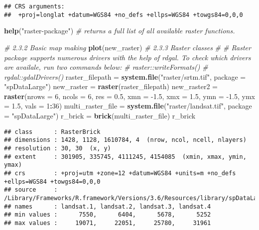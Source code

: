 \documentclass[]{article}
\newenvironment{Shaded}{\begin{snugshade}}{\end{snugshade}}
\newcommand{\CommentTok}[1]{\textcolor[rgb]{0.56,0.35,0.01}{\textit{#1}}}
\newcommand{\DataTypeTok}[1]{\textcolor[rgb]{0.13,0.29,0.53}{#1}}
\newcommand{\DecValTok}[1]{\textcolor[rgb]{0.00,0.00,0.81}{#1}}
\newcommand{\FloatTok}[1]{\textcolor[rgb]{0.00,0.00,0.81}{#1}}
\newcommand{\KeywordTok}[1]{\textcolor[rgb]{0.13,0.29,0.53}{\textbf{#1}}}
\newcommand{\NormalTok}[1]{#1}
\newcommand{\OperatorTok}[1]{\textcolor[rgb]{0.81,0.36,0.00}{\textbf{#1}}}
\newcommand{\StringTok}[1]{\textcolor[rgb]{0.31,0.60,0.02}{#1}}
\begin{document}
\begin{verbatim}
## CRS arguments:
##  +proj=longlat +datum=WGS84 +no_defs +ellps=WGS84 +towgs84=0,0,0
\end{verbatim}

\begin{Shaded}
\begin{Highlighting}[]
\KeywordTok{help}\NormalTok{(}\StringTok{"raster-package"}\NormalTok{) }\CommentTok{# returns a full list of all available raster functions.}

\CommentTok{# 2.3.2 Basic map making}
\KeywordTok{plot}\NormalTok{(new_raster)}
\CommentTok{# 2.3.3 Raster classes}
\CommentTok{# # Raster package supports numerous drivers with the help of rdgal. To check which drivers are availale, run two commands below:}
\CommentTok{# raster::writeFormats()}
\CommentTok{# rgdal::gdalDrivers()}
\NormalTok{raster_filepath =}\StringTok{ }\KeywordTok{system.file}\NormalTok{(}\StringTok{"raster/srtm.tif"}\NormalTok{, }\DataTypeTok{package =} \StringTok{"spDataLarge"}\NormalTok{)}
\NormalTok{new_raster =}\StringTok{ }\KeywordTok{raster}\NormalTok{(raster_filepath)}
\NormalTok{new_raster2 =}\StringTok{ }\KeywordTok{raster}\NormalTok{(}\DataTypeTok{nrows =} \DecValTok{6}\NormalTok{, }\DataTypeTok{ncols =} \DecValTok{6}\NormalTok{, }\DataTypeTok{res =} \FloatTok{0.5}\NormalTok{,}
                     \DataTypeTok{xmn =} \FloatTok{-1.5}\NormalTok{, }\DataTypeTok{xmx =} \FloatTok{1.5}\NormalTok{, }\DataTypeTok{ymn =} \FloatTok{-1.5}\NormalTok{, }\DataTypeTok{ymx =} \FloatTok{1.5}\NormalTok{,}
                     \DataTypeTok{vals =} \DecValTok{1}\OperatorTok{:}\DecValTok{36}\NormalTok{)}
\NormalTok{multi_raster_file =}\StringTok{ }\KeywordTok{system.file}\NormalTok{(}\StringTok{"raster/landsat.tif"}\NormalTok{, }\DataTypeTok{package =} \StringTok{"spDataLarge"}\NormalTok{)}
\NormalTok{r_brick =}\StringTok{ }\KeywordTok{brick}\NormalTok{(multi_raster_file)}
\NormalTok{r_brick}
\end{Highlighting}
\end{Shaded}

\begin{verbatim}
## class      : RasterBrick 
## dimensions : 1428, 1128, 1610784, 4  (nrow, ncol, ncell, nlayers)
## resolution : 30, 30  (x, y)
## extent     : 301905, 335745, 4111245, 4154085  (xmin, xmax, ymin, ymax)
## crs        : +proj=utm +zone=12 +datum=WGS84 +units=m +no_defs +ellps=WGS84 +towgs84=0,0,0 
## source     : /Library/Frameworks/R.framework/Versions/3.6/Resources/library/spDataLarge/raster/landsat.tif 
## names      : landsat.1, landsat.2, landsat.3, landsat.4 
## min values :      7550,      6404,      5678,      5252 
## max values :     19071,     22051,     25780,     31961
\end{verbatim}
\end{document}
